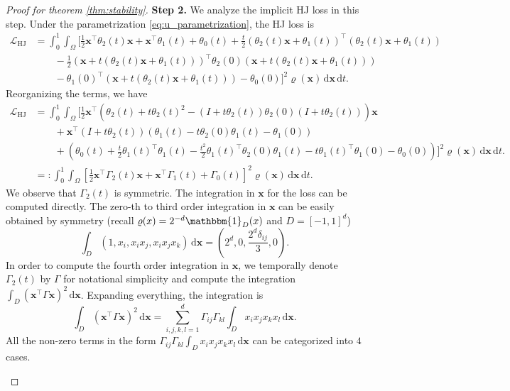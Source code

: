 \documentclass{article} %
\theoremstyle{plain}
\theoremstyle{definition}
\theoremstyle{remark}
\newcommand{\bx}{\mathbf{x}}
\newcommand{\mL}{\mathcal{L}}
\newcommand{\Gl}{\Gamma_0}
\newcommand{\Gy}{\Gamma_1}
\newcommand{\Ge}{\Gamma_2}
\newcommand{\rd}{\mathrm{d}}
\newcommand{\tp}{^{\top}}
\newcommand{\parentheses}[1]{\left(#1\right)}
\newcommand{\sqbra}[1]{\left[#1\right]}
\begin{document}
\begin{proof}[Proof for theorem \ref{thm:stability}]
\medskip
\textbf{Step 2.} We analyze the implicit HJ loss in this step. Under the parametrization \eqref{eq:u_parametrization}, the HJ loss is
\begin{align*}
\mL_{\text{HJ}} & = \int_0^1 \int_\Omega \Big[ \frac12 \bx\tp \theta_2(t) \bx + \bx\tp \theta_1(t) + \theta_0(t) + \frac{t}{2} \parentheses{\theta_2(t)\bx + \theta_1(t)}\tp \parentheses{\theta_2(t)\bx + \theta_1(t)} \\
& \quad\quad -\frac12 \parentheses{\bx + t(\theta_2(t)\bx + \theta_1(t))}\tp \theta_2(0) \parentheses{\bx + t(\theta_2(t)\bx + \theta_1(t))} \\
& \quad \quad -\theta_1(0)\tp \parentheses{\bx + t(\theta_2(t)\bx + \theta_1(t))} - \theta_0(0) \Big]^2 \varrho(\bx) \,\rd \bx\,\rd t.
\end{align*}
Reorganizing the terms, we have
\begin{align*}
\mL_{\text{HJ}} & = \int_0^1 \int_\Omega \bigg[ \frac12 \bx\tp \parentheses{\theta_2(t) + t\theta_2(t)^2 - (I+t\theta_2(t)) \theta_2(0) (I+t\theta_2(t)) } \bx \\
& \quad\quad + \bx\tp \parentheses{I + t\theta_2(t)}\parentheses{\theta_1(t) - t \theta_2(0)\theta_1(t) - \theta_1(0)} \\
& \quad \quad +\parentheses{\theta_0(t) + \frac{t}{2} \theta_1(t)\tp \theta_1(t) - \frac{t^2}{2} \theta_1(t)\tp \theta_2(0) \theta_1(t) - t \theta_1(t)\tp \theta_1(0) - \theta_0(0)} \bigg]^2 \varrho(\bx) \,\rd \bx\,\rd t. \\
& =: \int_0^1 \int_\Omega \sqbra{ \frac12 \bx\tp \Ge(t)\bx + \bx\tp \Gy(t) + \Gl(t) }^2 \varrho(\bx) \,\rd \bx\,\rd t.
\end{align*}
We observe that $\Ge(t)$ is symmetric. The integration in $\bx$ for the loss can be computed directly. The zero-th to third order integration in $\bx$ can be easily obtained by symmetry (recall $\varrho(x) = 2^{-d} \mathbbm{1}_{D}(x)$ and $D=[-1,1]^d$)
$$\int_D (1,x_i,x_ix_j,x_ix_jx_k) \, \rd \bx = \parentheses{2^d, 0, \frac{2^d \delta_{ij}}{3},0}.$$
In order to compute the fourth order integration in $\bx$, we temporally denote $\Ge(t)$ by $\Gamma$ for notational simplicity and compute the integration $\int_D (\bx\tp\Gamma \bx)^2 \,\rd \bx$. Expanding everything, the integration is
$$\int_D (\bx\tp\Gamma \bx)^2 \,\rd \bx = \sum_{i,j,k,l=1}^d \Gamma_{ij}\Gamma_{kl} \int_D x_ix_jx_kx_l \,\rd \bx.$$
All the non-zero terms in the form $\Gamma_{ij}\Gamma_{kl} \int_D x_ix_jx_kx_l \,\rd \bx$ can be categorized into $4$ cases.
\begin{enumerate}

\end{enumerate}
\end{proof}
\end{document}
